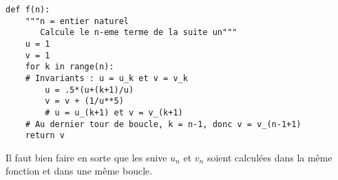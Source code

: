 \question{}

\begin{lstlisting}
def f(n):
    """n = entier naturel
       Calcule le n-eme terme de la suite un"""
    u = 1
    v = 1
    for k in range(n):
	# Invariants : u = u_k et v = v_k
        u = .5*(u+(k+1)/u)
        v = v + (1/u**5)
        # u = u_(k+1) et v = v_(k+1)
    # Au dernier tour de boucle, k = n-1, donc v = v_(n-1+1)
    return v
\end{lstlisting}

\question{}

Il faut bien faire en sorte que les suive $u_n$ et $v_n$ soient calculées dans la même fonction et dans une même boucle.